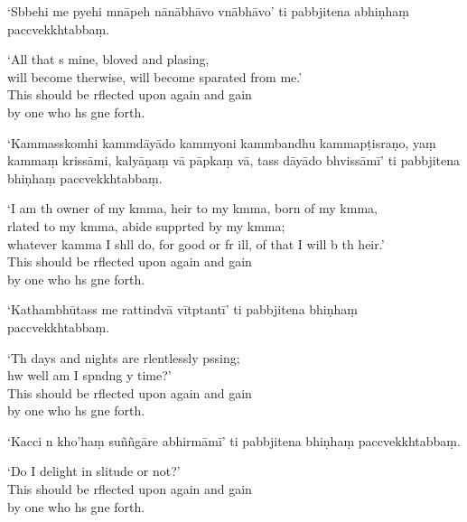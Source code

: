 `Sbbehi me pyehi mnāpeh nānābhāvo vnābhāvo' ti pabbjitena abhiṇhaṃ paccvekkhtabbaṃ.

\begin{english}
  `All that s mine, bloved and plasing,\\
  will become therwise, will become sparated from me.'\\
  This should be rflected upon again and gain\\
  by one who hs gne forth.
\end{english}

`Kammasskomhi kammdāyādo kammyoni kammbandhu kammapṭisraṇo, yaṃ kammaṃ krissāmi, kalyāṇaṃ vā pāpkaṃ vā, tass dāyādo bhvissāmī' ti pabbjitena bhiṇhaṃ paccvekkhtabbaṃ.

\begin{english}
  `I am th owner of my kmma, heir to my kmma, born of my kmma,\\
  rlated to my kmma, abide supprted by my kmma;\\
  whatever kamma I shll do, for good or fr ill, of that I will b th heir.'\\
  This should be rflected upon again and gain\\
  by one who hs gne forth.
\end{english}

\clearpage

`Kathambhūtass me rattindvā vītptantī' ti pabbjitena bhiṇhaṃ paccvekkhtabbaṃ.

\begin{english}
  `Th days and nights are rlentlessly pssing;\\
  hw well am I spndng y time?'\\
  This should be rflected upon again and gain\\
  by one who hs gne forth.
\end{english}

`Kacci n kho'haṃ suññgāre abhirmāmī' ti pabbjitena bhiṇhaṃ paccvekkhtabbaṃ.

\begin{english}
  `Do I delight in slitude or not?'\\
  This should be rflected upon again and gain\\
  by one who hs gne forth.
\end{english}

